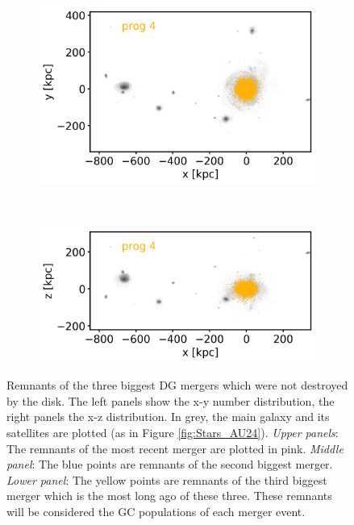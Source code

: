 \begin{figure}[htbp]
    \begin{subfigure}[c]{0.48\textwidth}
    \centering
    	\includegraphics[width=\textwidth]{plots/Dynamics/dist/xy_dist_wodisk_GCs_prog_4_snap_127.png}
    	\label{fig:prog4_xy}
    \end{subfigure}
    ~ %
    \begin{subfigure}[c]{0.48\textwidth}
        \centering
    	\includegraphics[width=\textwidth]{plots/Dynamics/dist/xz_dist_wodisk_GCs_prog_4_snap_127.png}
	    \label{fig:prog4_xz}
    \end{subfigure}
    \caption{Remnants of the three biggest \ac{DG} mergers which were not destroyed by the disk. The left panels show the x-y number distribution, the right panels the x-z distribution. In grey, the main galaxy and its satellites are plotted (as in Figure \ref{fig:Stars_AU24}). \textit{Upper panels}: The remnants of the most recent merger are plotted in pink. \textit{Middle panel}: The blue points are remnants of the second biggest merger. \textit{Lower panel}: The yellow points are remnants of the third biggest merger which is the most long ago of these three. These remnants will be considered the \ac{GC} populations of each merger event.}\label{fig:progenitors_distribution}
\end{figure}
